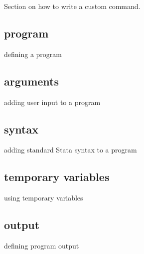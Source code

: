 
Section on how to write a custom command.

\subsection{program}

defining a program

\subsection{arguments}

adding user input to a program

\subsection{syntax}

adding standard Stata syntax to a program

\subsection{temporary variables}

using temporary variables

\subsection{output}

defining program output
